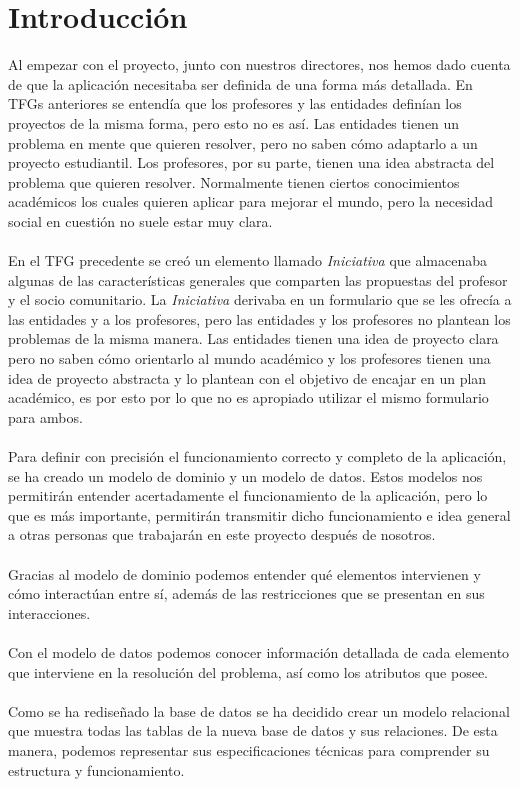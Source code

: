 \documentclass[11pt]{book}
\begin{document}
	\section{Introducción}
	Al empezar con el proyecto, junto con nuestros directores, nos hemos dado cuenta de que la aplicación necesitaba ser definida de una forma más detallada. En TFGs anteriores se entendía que los profesores y las entidades definían los proyectos de la misma forma, pero esto no es así. Las entidades tienen un problema en mente que quieren resolver, pero no saben cómo adaptarlo a un proyecto estudiantil. Los profesores, por su parte, tienen una idea abstracta del problema que quieren resolver. Normalmente tienen ciertos conocimientos académicos los cuales quieren aplicar para mejorar el mundo, pero la necesidad social en cuestión no suele estar muy clara.\\\\
	En el TFG precedente se creó un elemento llamado \emph{Iniciativa} que almacenaba algunas de las características generales que comparten las propuestas del profesor y el socio comunitario. La \emph{Iniciativa} derivaba en un formulario que se les ofrecía a las entidades y a los profesores, pero las entidades y los profesores no plantean los problemas de la misma manera. Las entidades tienen una idea de proyecto clara pero no saben cómo orientarlo al mundo académico y los profesores tienen una idea de proyecto abstracta y lo plantean con el objetivo de encajar en un plan académico, es por esto por lo que no es apropiado utilizar el mismo formulario para ambos.\\\\
	Para definir con precisión el funcionamiento correcto y completo de la aplicación, se ha creado un modelo de dominio y un modelo de datos.
	Estos modelos nos permitirán entender acertadamente el funcionamiento de la aplicación, pero lo que es más importante, permitirán transmitir dicho funcionamiento e idea general a otras personas que trabajarán en este proyecto después de nosotros.\\\\
	Gracias al modelo de dominio podemos entender qué elementos intervienen y cómo interactúan entre sí, además de las restricciones que se presentan en sus interacciones.\\\\
	Con el modelo de datos podemos conocer información detallada de cada elemento que interviene en la resolución del problema, así como los atributos que posee.\\\\
	Como se ha rediseñado la base de datos se ha decidido crear un modelo relacional que muestra todas las tablas de la nueva base de datos y sus relaciones. De esta manera, podemos representar sus especificaciones técnicas para comprender su estructura y funcionamiento. 
	
\end{document}
